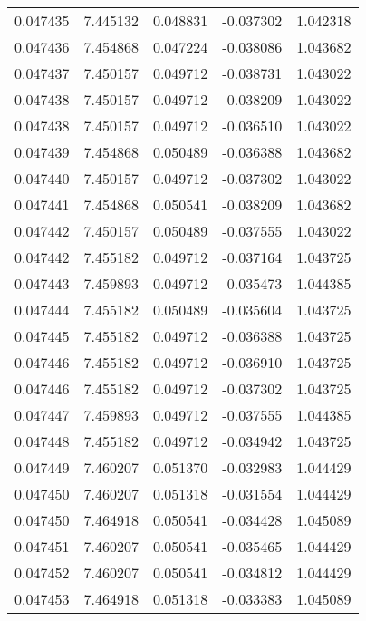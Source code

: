 \begin{tabular}{lrrrr}
0.047435    &  7.445132 &  0.048831 & -0.037302 &             1.042318 \\
0.047436    &  7.454868 &  0.047224 & -0.038086 &             1.043682 \\
0.047437    &  7.450157 &  0.049712 & -0.038731 &             1.043022 \\
0.047438    &  7.450157 &  0.049712 & -0.038209 &             1.043022 \\
0.047438    &  7.450157 &  0.049712 & -0.036510 &             1.043022 \\
0.047439    &  7.454868 &  0.050489 & -0.036388 &             1.043682 \\
0.047440    &  7.450157 &  0.049712 & -0.037302 &             1.043022 \\
0.047441    &  7.454868 &  0.050541 & -0.038209 &             1.043682 \\
0.047442    &  7.450157 &  0.050489 & -0.037555 &             1.043022 \\
0.047442    &  7.455182 &  0.049712 & -0.037164 &             1.043725 \\
0.047443    &  7.459893 &  0.049712 & -0.035473 &             1.044385 \\
0.047444    &  7.455182 &  0.050489 & -0.035604 &             1.043725 \\
0.047445    &  7.455182 &  0.049712 & -0.036388 &             1.043725 \\
0.047446    &  7.455182 &  0.049712 & -0.036910 &             1.043725 \\
0.047446    &  7.455182 &  0.049712 & -0.037302 &             1.043725 \\
0.047447    &  7.459893 &  0.049712 & -0.037555 &             1.044385 \\
0.047448    &  7.455182 &  0.049712 & -0.034942 &             1.043725 \\
0.047449    &  7.460207 &  0.051370 & -0.032983 &             1.044429 \\
0.047450    &  7.460207 &  0.051318 & -0.031554 &             1.044429 \\
0.047450    &  7.464918 &  0.050541 & -0.034428 &             1.045089 \\
0.047451    &  7.460207 &  0.050541 & -0.035465 &             1.044429 \\
0.047452    &  7.460207 &  0.050541 & -0.034812 &             1.044429 \\
0.047453    &  7.464918 &  0.051318 & -0.033383 &             1.045089 \\

\end{tabular}
